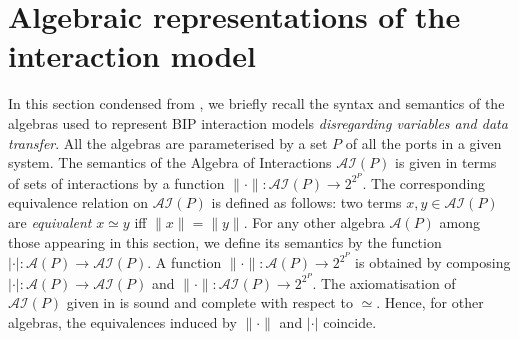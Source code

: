 \documentclass{llncs}
\newcommand{\cA}{\ensuremath{\mathcal{A}}}
\newcommand{\intsem}[1]{\ensuremath{\|{#1}\|}}
\newcommand{\aisem}[1]{\ensuremath{|{#1}|}}
\newcommand{\ai}{\ensuremath{\mathcal{AI}}}
\begin{document}


\section{Algebraic representations of the interaction model}
\label{secn:algebras}

In this section condensed from
\cite[Section~4]{BarBliu15-offer-scico}, we briefly recall the syntax
and semantics of the algebras used to represent BIP interaction models
\emph{disregarding variables and data transfer}.  All the algebras are
parameterised by a set $P$ of all the ports in a given system.  The
semantics of the Algebra of Interactions $\ai(P)$ is given in terms of
sets of interactions by a function $\intsem{\cdot}: \ai(P) \rightarrow
2^{2^P}$.  The corresponding equivalence relation on $\ai(P)$ is
defined as follows: two terms $x,y \in \ai(P)$ are {\em equivalent} $x
\simeq y$ iff $\intsem{x} = \intsem{y}$.  For any other algebra
$\cA(P)$ among those appearing in this section, we define its
semantics by the function $\aisem{\cdot}: \cA(P) \rightarrow \ai(P)$.
A function $\intsem{\cdot}: \cA(P) \rightarrow 2^{2^P}$ is obtained by
composing $\aisem{\cdot}: \cA(P) \rightarrow \ai(P)$ and
$\intsem{\cdot}: \ai(P) \rightarrow 2^{2^P}$.  The axiomatisation of
$\ai(P)$ given in \cite{BliSif07-acp-emsoft} is sound and complete
with respect to $\simeq$.  Hence, for other algebras, the equivalences
induced by $\intsem{\cdot}$ and $\aisem{\cdot}$ coincide.
\end{document}
